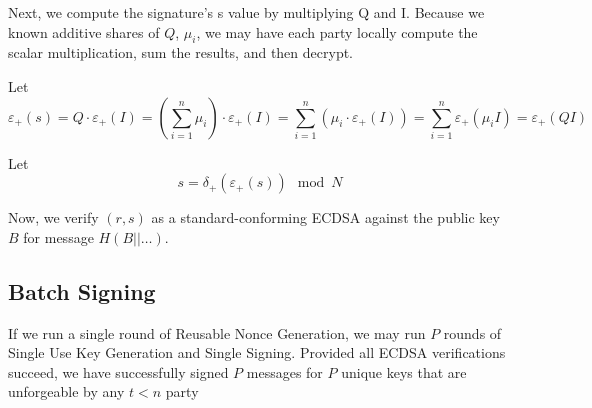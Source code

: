 \documentclass{article}
\newcommand{\addencrypt}{\varepsilon_{+}}
\newcommand{\adddecrypt}{\delta_{+}}
\begin{document}
Next, we compute the signature's s value by multiplying Q and I. Because we
known additive shares of $Q$, $\mu_i$, we may have each party locally compute
the scalar multiplication, sum the results, and then decrypt.

Let $$ \addencrypt(s) = Q \cdot \addencrypt(I) 
    = \left( \sum_{i=1}^n \mu_i \right) \cdot \addencrypt(I)
    = \sum_{i=1}^n \left( \mu_i \cdot \addencrypt(I)\right)
    = \sum_{i=1}^n \addencrypt(\mu_i I)
    = \addencrypt(Q I) $$

Let $$ s = \adddecrypt(\addencrypt(s)) \mod N$$


Now, we verify $(r,s)$ as a standard-conforming ECDSA against the public key
$B$ for message $H(B || \ldots)$.



\subsection{Batch Signing}

If we run a single round of Reusable Nonce Generation, we may run $P$ rounds of
Single Use Key Generation and Single Signing. Provided all ECDSA verifications
succeed, we have successfully signed $P$ messages for $P$ unique keys that are
unforgeable by any $t < n$ party
\end{document}
